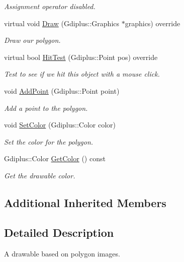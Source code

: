 \begin{DoxyCompactItemize}
\begin{DoxyCompactList}\small\item\em Assignment operator disabled. \end{DoxyCompactList}\item 
virtual void \hyperlink{class_c_poly_drawable_a701f45c8fabdec3de96b3048aa3a0190}{Draw} (Gdiplus\+::\+Graphics $\ast$graphics) override
\begin{DoxyCompactList}\small\item\em Draw our polygon. \end{DoxyCompactList}\item 
virtual bool \hyperlink{class_c_poly_drawable_a4db3493e3bba3c4c51608a75d48f50e2}{Hit\+Test} (Gdiplus\+::\+Point pos) override
\begin{DoxyCompactList}\small\item\em Test to see if we hit this object with a mouse click. \end{DoxyCompactList}\item 
void \hyperlink{class_c_poly_drawable_a500a475002f4be3cfe6ed865aea0a827}{Add\+Point} (Gdiplus\+::\+Point point)
\begin{DoxyCompactList}\small\item\em Add a point to the polygon. \end{DoxyCompactList}\item 
void \hyperlink{class_c_poly_drawable_a5d57281021db882ae059152f6f304aa0}{Set\+Color} (Gdiplus\+::\+Color color)
\begin{DoxyCompactList}\small\item\em Set the color for the polygon. \end{DoxyCompactList}\item 
Gdiplus\+::\+Color \hyperlink{class_c_poly_drawable_a441ecfc08876545cfe6f49cc81365328}{Get\+Color} () const 
\begin{DoxyCompactList}\small\item\em Get the drawable color. \end{DoxyCompactList}\end{DoxyCompactItemize}
\subsection*{Additional Inherited Members}


\subsection{Detailed Description}
A drawable based on polygon images. 

